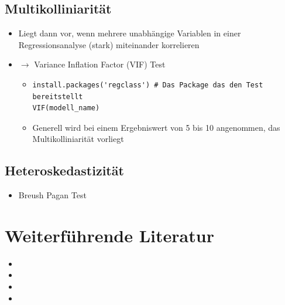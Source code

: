 \documentclass[10pt,a4paper]{article}
\newcommand{\oarrow}{\textcolor{A1}{$\rightarrow$} }
\begin{document}
    \subsection{Multikolliniarität}
    \begin{itemize}
        \item Liegt dann vor, wenn mehrere unabhängige Variablen in einer Regressionsanalyse (stark) miteinander korrelieren
        \item[] \oarrow Variance Inflation Factor (VIF) Test
        \begin{itemize}
            \item[] \begin{lstlisting}
install.packages('regclass') # Das Package das den Test bereitstellt
VIF(modell_name)
            \end{lstlisting}
        \item Generell wird bei einem Ergebniswert von 5 bis 10 angenommen, das Multikolliniarität vorliegt
        \end{itemize}
    \end{itemize}

    \subsection{Heteroskedastizität}
        \begin{itemize}
            \item 
            Breush Pagan Test
        \end{itemize}




\section{Weiterführende Literatur}
\begin{itemize}
    \item {} 
    \item {}
    \item {}
    \item {}
  \end{itemize}
\end{document}
